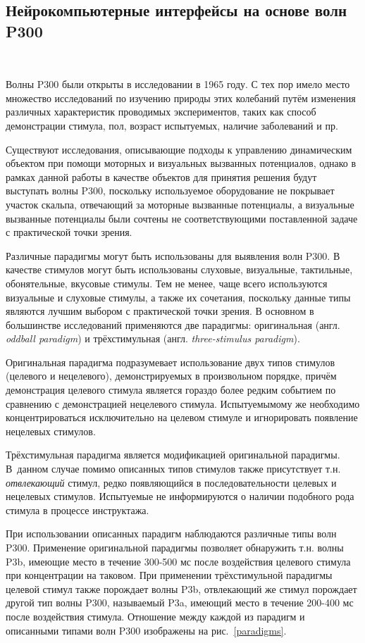 \documentclass[12pt,a4paper,oneside,fleqn,leqno]{article}
\newcounter{pe} %
\newcommand*{\Nep}{\addtocounter{pe}{1}{\arabic{pe}$^{\circ}$.\;}}
\newcommand*{\NepS}{\mbox{} \\ \Nep}
\begin{document}
	\subsection{Нейрокомпьютерные интерфейсы на основе волн P300}
	\setcounter{pe}{0}
	\NepS {\bf Вызванные потенциалы и волны P300}
	\par Волны P300 были открыты в исследовании \cite{P300_first} в 1965 году. С тех пор имело место множество исследований по изучению природы этих колебаний путём изменения различных характеристик проводимых экспериментов, таких как способ демонстрации стимула, пол, возраст испытуемых, наличие заболеваний  и пр.
	\par Существуют исследования, описывающие подходы к управлению динамическим объектом при помощи моторных и визуальных вызванных потенциалов, однако в рамках данной работы в качестве объектов для принятия решения будут выступать волны P300, поскольку используемое оборудование не покрывает участок скальпа, отвечающий за моторные вызванные потенциалы, а визуальные вызванные потенциалы были сочтены не соответствующими поставленной задаче с практической точки зрения.
	\par Различные парадигмы могут быть использованы для выявления волн P300. В качестве стимулов могут быть использованы слуховые, визуальные, тактильные, обонятельные, вкусовые стимулы. Тем не менее, чаще всего используются визуальные и слуховые стимулы, а также их сочетания, поскольку данные типы являются лучшим выбором с практической точки зрения. В основном в большинстве исследований применяются две парадигмы: оригинальная (англ. {\it oddball paradigm}) и трёхстимульная (англ. {\it three-stimulus paradigm}).
	\par Оригинальная парадигма подразумевает использование двух типов стимулов (целевого и нецелевого), демонстрируемых в произвольном порядке, причём демонстрация целевого стимула является гораздо более редким событием по сравнению с демонстрацией нецелевого стимула. Испытуемымому же необходимо концентрироваться исключительно на целевом стимуле и игнорировать появление нецелевых стимулов.
	\par Трёхстимульная парадигма является модификацией оригинальной парадигмы. В~данном случае помимо описанных типов стимулов также присутствует т.н. {\it отвлекающий} стимул, редко появляющийся в последовательности целевых и нецелевых стимулов. Испытуемые не информируются о наличии подобного рода стимула в процессе инструктажа.
	\par При использовании описанных парадигм наблюдаются различные типы волн P300. Применение оригинальной парадигмы позволяет обнаружить т.н. волны P3b, имеющие место в течение 300-500 мс после воздействия целевого стимула при концентрации на таковом. При применении трёхстимульной парадигмы целевой стимул также порождает волны P3b, отвлекающий же стимул порождает другой тип волны P300, называемый P3a, имеющий место в течение 200-400 мс после воздействия стимула. Отношение между каждой из парадигм и описанными типами волн P300 изображены на рис.~\ref{paradigms}.
\end{document}
